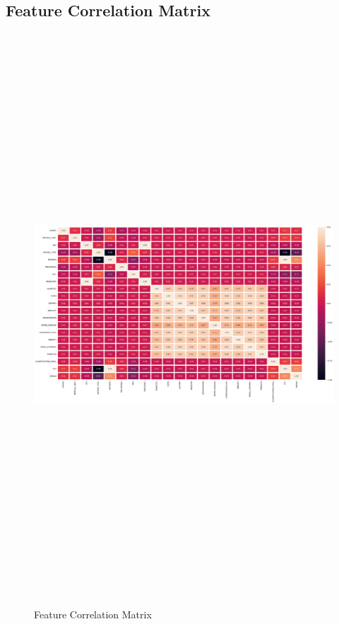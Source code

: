 \subsection{Feature Correlation Matrix}
\begin{figure}[H]%
    \caption{Feature Correlation Matrix}%
    \label{fig:feat_corr_matrix}%
    \centering
    {\includegraphics[angle=90, height=21cm]{img/appendix/insights_correlation_matrix.png} }
\end{figure}

\newpage
